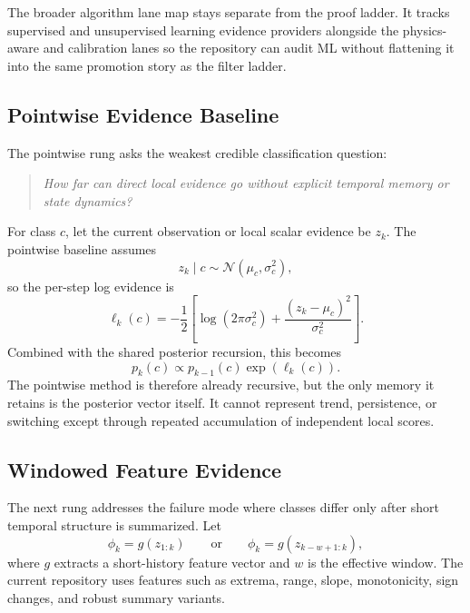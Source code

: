 \documentclass[11pt]{article}
\begin{document}
\noindent
The broader algorithm lane map stays separate from the proof ladder. It tracks supervised and unsupervised learning evidence providers alongside the physics-aware and calibration lanes so the repository can audit ML without flattening it into the same promotion story as the filter ladder.


\subsection{Pointwise Evidence Baseline}
The pointwise rung asks the weakest credible classification question:
\begin{quote}
\textit{How far can direct local evidence go without explicit temporal memory or
state dynamics?}
\end{quote}
For class \(c\), let the current observation or local scalar evidence be
\(z_k\). The pointwise baseline assumes
\begin{equation}
z_k \mid c \sim \mathcal{N}(\mu_c, \sigma_c^2),
\end{equation}
so the per-step log evidence is
\begin{equation}
\ell_k(c)
=
-\frac{1}{2}
\left[
\log(2\pi \sigma_c^2)
+
\frac{(z_k-\mu_c)^2}{\sigma_c^2}
\right].
\end{equation}
Combined with the shared posterior recursion, this becomes
\begin{equation}
p_k(c) \propto p_{k-1}(c)\exp(\ell_k(c)).
\end{equation}
The pointwise method is therefore already recursive, but the only memory it
retains is the posterior vector itself. It cannot represent trend, persistence,
or switching except through repeated accumulation of independent local scores.

\subsection{Windowed Feature Evidence}
The next rung addresses the failure mode where classes differ only after short
temporal structure is summarized. Let
\begin{equation}
\phi_k = g(z_{1:k}) \qquad \text{or} \qquad \phi_k = g(z_{k-w+1:k}),
\end{equation}
where \(g\) extracts a short-history feature vector and \(w\) is the effective
window. The current repository uses features such as extrema, range, slope,
monotonicity, sign changes, and robust summary variants.
\end{document}
